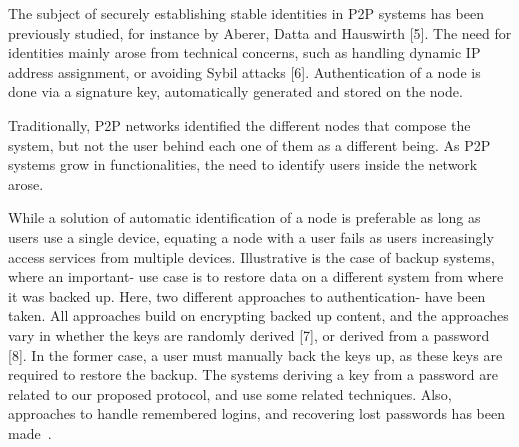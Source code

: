 The subject of securely establishing stable identities in P2P
systems has been previously studied, for instance by Aberer,
Datta and Hauswirth [5]. The need for identities mainly arose
from technical concerns, such as handling dynamic IP address
assignment, or avoiding Sybil attacks [6]. Authentication of a
node is done via a signature key, automatically generated and
stored on the node.

Traditionally, P2P networks identified the different nodes that compose the
system, but not the user behind each one of them as a different being.
As P2P systems grow in functionalities, the need to identify users inside the
network arose.

While a solution of automatic identification of a node is preferable as long as
users use a single device, equating a node with a user fails as users
increasingly access services from multiple devices.
Illustrative is the case of backup systems, where an important-
  use case is to restore data on a different system from where
it was backed up. Here, two different approaches to authentication-
  have been taken. All approaches build on encrypting
backed up content, and the approaches vary in whether the
keys are randomly derived [7], or derived from a password [8].
In the former case, a user must manually back the keys up,
as these keys are required to restore the backup. The systems
deriving a key from a password are related to our proposed
protocol, and use some related techniques. Also, approaches to handle
remembered logins, and recovering lost passwords has been
made~\cite{kreitz2012passwords}.


